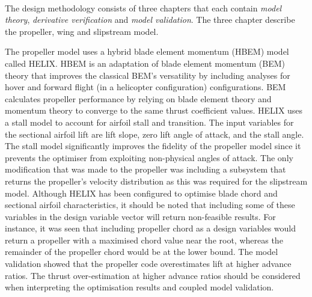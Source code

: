 \\
The design methodology consists of three chapters that each contain \textit{model theory}, \textit{derivative verification} and \textit{model validation}. The three chapter describe the propeller, wing and slipstream model.

The propeller model uses a hybrid blade element momentum (HBEM) model called HELIX. HBEM is an adaptation of blade element momentum (BEM) theory that improves the classical BEM's versatility by including analyses for hover and forward flight (in a helicopter configuration) configurations. BEM calculates propeller performance by relying on blade element theory and momentum theory to converge to the same thrust coefficient values. HELIX uses a stall model to account for airfoil stall and transition. The input variables for the sectional airfoil lift are lift slope, zero lift angle of attack, and the stall angle. The stall model significantly improves the fidelity of the propeller model since it prevents the optimiser from exploiting non-physical angles of attack. The only modification that was made to the propeller was including a subsystem that returns the propeller's velocity distribution as this was required for the slipstream model. Although HELIX has been configured to optimise blade chord and sectional airfoil characteristics, it should be noted that including some of these variables in the design variable vector will return non-feasible results. For instance, it was seen that including propeller chord as a design variables would return a propeller with a maximised chord value near the root, whereas the remainder of the propeller chord would be at the lower bound. The model validation showed that the propeller code overestimates lift at higher advance ratios. The thrust over-estimation at higher advance ratios should be considered when interpreting the optimisation results and coupled model validation.\\
\\
